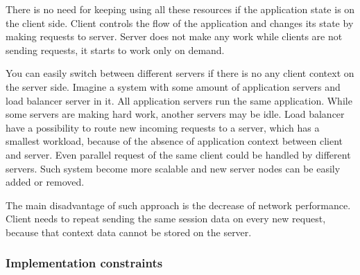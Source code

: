 There is no need for keeping using all these resources if the application state
is on the client side. Client controls the flow of the application and
changes its state by making requests to server. Server does not make any work
while clients are not sending requests, it starts to work only on demand.

You can easily switch between different servers if there is no any client
context on the server side. Imagine a system with some amount of application
servers and load balancer server in it. All application servers run the same
application. While some servers are making hard work, another servers may be
idle.
Load balancer have a possibility to route new incoming requests to a server,
which has a smallest workload, because of the absence of application context
between client and server. Even parallel request of the same client could be
handled by different servers. Such system become more scalable and new server
nodes can be easily added or removed.

The main disadvantage of such approach is the decrease of network performance.
Client needs to repeat sending the same session data on every new request,
because that context data cannot be stored on the server. 


\subsubsection{Implementation constraints}

